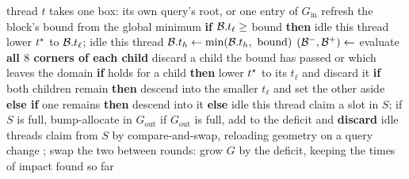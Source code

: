\begin{algorithm}[!tb]
\caption{Device narrow phase: a kernel that runs to completion on the work it
was given, and a host loop that relaunches it on what it spilled. $S$ is the
per-block shared stack ($64$ entries) and $G$ the double-buffered global queue.}
\label{alg:device}
\footnotesize
\begin{algorithmic}[1]
  \State thread $t$ takes one box: its own query's root, or one entry of
         $G_{\mathrm{in}}$
    \State refresh the block's bound from the global minimum
    \State \textbf{if} $\mathcal{B}.t_{\ell} \ge$ bound \textbf{then} idle this thread
      \State lower $t^{\star}$ to $\mathcal{B}.t_{\ell}$; idle this thread
    \Else
      \State $\dom.t_{h} \gets \min(\dom.t_{h},\ \mathrm{bound})$
      \State $(\mathcal{B}^{-},\mathcal{B}^{+}) \gets$ 
      \State evaluate \textbf{all $8$ corners of each child}
      \State discard a child the bound has passed or which leaves the domain
      \State \textbf{if}  holds for a child \textbf{then} lower
             $t^{\star}$ to its $t_{\ell}$ and discard it
      \State \textbf{if} both children remain \textbf{then} descend into the
             smaller $t_{\ell}$ and set the other aside
      \State \textbf{else if} one remains \textbf{then} descend into it
             \textbf{else} idle this thread
    \EndIf
      \State claim a slot in $S$; if $S$ is full, bump-allocate in
             $G_{\mathrm{out}}$
      \State if $G_{\mathrm{out}}$ is full, add to the deficit and
             \textbf{discard}
    \EndIf
    \State idle threads claim from $S$ by compare-and-swap, reloading geometry
           on a query change
  \EndWhile
\EndFunction
\Statex
{}
  \Repeat
    \State {}
      \State {}; swap the two
    \EndWhile
  \State between rounds: grow $G$ by the deficit, keeping the times of impact
         found so far
\EndFunction
\end{algorithmic}
\end{algorithm}

